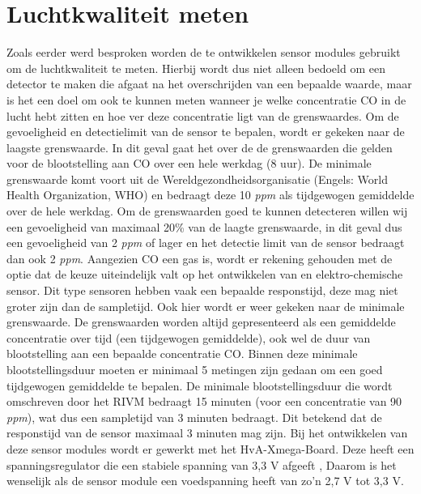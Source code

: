 \documentclass[a4paper, 11pt]{article} %
\begin{document}
\section{Luchtkwaliteit meten}
Zoals eerder werd besproken worden de te ontwikkelen sensor modules gebruikt om de luchtkwaliteit te meten. Hierbij wordt dus niet alleen bedoeld om een detector te maken die afgaat na het overschrijden van een bepaalde waarde, maar is het een doel om ook te kunnen meten wanneer je welke concentratie CO in de lucht hebt zitten en hoe ver deze concentratie ligt van de grenswaardes. Om de gevoeligheid en detectielimit van de sensor te bepalen, wordt er gekeken naar de laagste grenswaarde. In dit geval gaat het over de de grenswaarden die gelden voor de blootstelling aan CO over een hele werkdag (8 uur). De minimale grenswaarde komt voort uit de Wereldgezondheidsorganisatie (Engels: World Health Organization, WHO) en bedraagt deze 10 \textit{ppm} als tijdgewogen gemiddelde over de hele werkdag. Om de grenswaarden goed te kunnen detecteren willen wij een gevoeligheid van maximaal 20\% van de laagte grenswaarde, in dit geval dus een gevoeligheid van 2 \textit{ppm} of lager en het detectie limit van de sensor bedraagt dan ook 2 \textit{ppm}. Aangezien CO een gas is, wordt er rekening gehouden met de optie dat de keuze uiteindelijk valt op het ontwikkelen van en elektro-chemische sensor. Dit type sensoren hebben vaak een bepaalde responstijd, deze mag niet groter zijn dan de sampletijd. Ook hier wordt er weer gekeken naar de minimale grenswaarde. De grenswaarden worden altijd gepresenteerd als een gemiddelde concentratie over tijd (een tijdgewogen gemiddelde), ook wel de duur van blootstelling aan een bepaalde concentratie CO. Binnen deze minimale blootstellingsduur moeten er minimaal 5 metingen zijn gedaan om een goed tijdgewogen gemiddelde te bepalen. De minimale blootstellingsduur die wordt omschreven door het RIVM bedraagt 15 minuten (voor een concentratie van 90 \textit{ppm}), wat dus een sampletijd van 3 minuten bedraagt. Dit betekend dat de responstijd van de sensor maximaal 3 minuten mag zijn. Bij het ontwikkelen van deze sensor modules wordt er gewerkt met het HvA-Xmega-Board. Deze heeft een spanningsregulator die een stabiele spanning van 3,3 V afgeeft \cite{xmega}, Daarom is het wenselijk als de sensor module een voedspanning heeft van zo'n 2,7 V tot 3,3 V.
\end{document}
